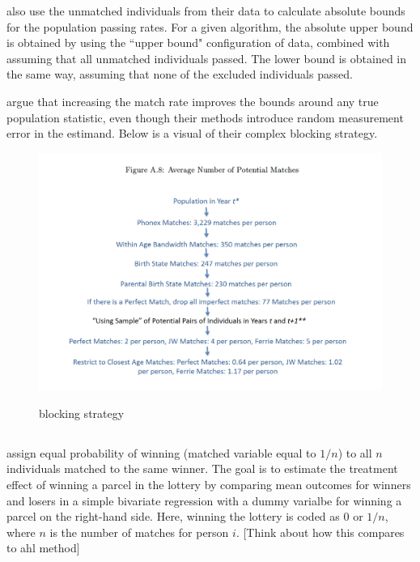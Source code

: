 \documentclass[12pt]{article}
\begin{document}
\cite{nq2015} also use the unmatched individuals from their data to calculate absolute bounds for the population passing rates.  For a given algorithm, the absolute upper bound is obtained by using the ``upper bound" configuration of data, combined with assuming that all unmatched individuals passed.  The lower bound is obtained in the same way, assuming that none of the excluded individuals passed. 

\cite{nq2015} argue that increasing the match rate improves the bounds around any true population statistic, even though their methods introduce random measurement error in the estimand.  Below is a visual of their complex blocking strategy.

\begin{figure}[htbp]
\begin{center}
\caption{\cite{nq2015} blocking strategy}
\includegraphics[width=\textwidth]{nq_method.png}
\label{default}
\end{center}
\end{figure}
\subsection{\cite{bleakley2016}}

\cite{bleakley2016} assign equal probability of winning (matched variable equal to $1/n$) to all $n$ individuals matched to the same winner.  The goal is to estimate the treatment effect of winning a parcel in the lottery by comparing mean outcomes for winners and losers in a simple bivariate regression with a dummy varialbe for winning a parcel on the right-hand side.   Here, winning the lottery is coded as $0$ or $1/n$, where $n$ is the number of matches for person $i$. [Think about how this compares to ahl method]
\end{document}
